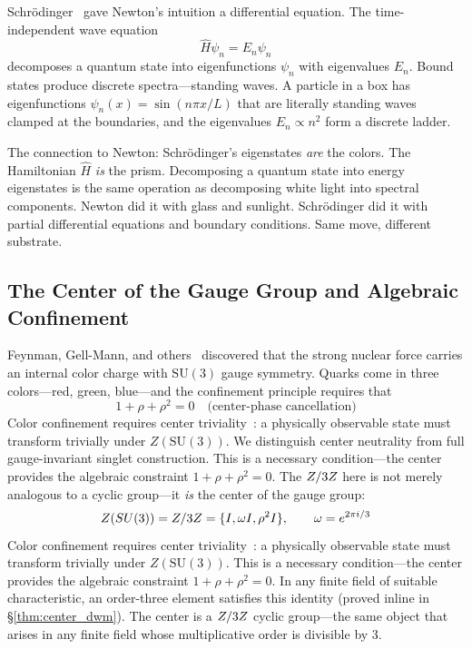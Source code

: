 Schr\"odinger~\cite{schrodinger} gave Newton's intuition a differential equation. The time-independent wave equation
\begin{equation}\label{eq:schrodinger}
\hat{H}\psi_n = E_n \psi_n
\end{equation}
decomposes a quantum state into eigenfunctions $\psi_n$ with eigenvalues $E_n$. Bound states produce discrete spectra---standing waves. A particle in a box has eigenfunctions $\psi_n(x) = \sin(n\pi x / L)$ that are literally standing waves clamped at the boundaries, and the eigenvalues $E_n \propto n^2$ form a discrete ladder.

The connection to Newton: Schr\"odinger's eigenstates \emph{are} the colors. The Hamiltonian $\hat{H}$ \emph{is} the prism. Decomposing a quantum state into energy eigenstates is the same operation as decomposing white light into spectral components. Newton did it with glass and sunlight. Schr\"odinger did it with partial differential equations and boundary conditions. Same move, different substrate.

\subsection{The Center of the Gauge Group and Algebraic Confinement}

Feynman, Gell-Mann, and others~\cite{feynman_qcd,gellmann} discovered that the strong nuclear force carries an internal color charge with $\mathrm{SU}(3)$ gauge symmetry. Quarks come in three colors---red, green, blue---and the confinement principle requires that 
\begin{equation}\label{eq:confinement}
1 + \rho + \rho^2 = 0 \quad \text{(center-phase cancellation)}
\end{equation}
Color confinement requires center triviality~\cite{greensite}: a physically observable state must transform trivially under $Z(\mathrm{SU}(3))$. We distinguish center neutrality from full gauge-invariant singlet construction. This is a necessary condition---the center provides the algebraic constraint $1 + \rho + \rho^2 = 0$. The $Z/3Z$ here is not merely analogous to a cyclic group---it \emph{is} the center of the gauge group:
\begin{equation}\label{eq:center}
Z(SU(3)) = Z/3Z = \{I, \omega I, \rho^2 I\}, \qquad \omega = e^{2\pi i/3}
\end{equation}
Color confinement requires center triviality~\cite{greensite}: a physically observable state must transform trivially under $Z(\mathrm{SU}(3))$. This is a necessary condition---the center provides the algebraic constraint $1 + \rho + \rho^2 = 0$. In any finite field of suitable characteristic, an order-three element satisfies this identity (proved inline in \S\ref{thm:center_dwm}). The center is a $Z/3Z$ cyclic group---the same object that arises in any finite field whose multiplicative order is divisible by 3.

